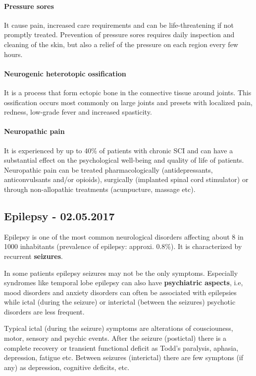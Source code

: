 \documentclass[12pt,article,oneside,a4paper]{memoir}
\begin{document}
\paragraph{Pressure sores}
It cause pain, increased care requirements and can be life-threatening if not
promptly treated. Prevention of pressure sores requires daily inspection and
cleaning of the skin, but also a relief of the pressure on each region every
few hours.

\paragraph{Neurogenic heterotopic ossification}
It is a process that form ectopic bone in the connective tissue around joints.
This ossification occurs most commonly on large joints and presets with
localized pain, redness, low-grade fever and increased spasticity.

\paragraph{Neuropathic pain}
It is experienced by up to 40\% of patients with chronic SCI and can have a
substantial effect on the psychological well-being and quality of life of
patients. Neuropathic pain can be treated pharmacologically (antidepressants,
anticonvulsants and/or opioids), surgically (implanted spinal cord stimulator)
or through non-allopathic treatments (acunpucture, massage etc).

\newpage
\subsection{Epilepsy - 02.05.2017}
Epilepsy is one of the most common neurological disorders affecting about 8 in
1000 inhabitants (prevalence of epilepsy: approxi. 0.8\%). It is characterized
by recurrent \textbf{seizures}.

In some patients epilepsy seizures may not be the only symptoms. Especially
syndromes like temporal lobe epilepsy can also have \textbf{psychiatric
aspects}, i.e, mood disorders and anxiety disorders can often be associated
with epilepsies while ictal (during the seizure) or interictal (between the
seizures) psychotic disorders are less frequent.

Typical ictal (during the seizure) symptoms are alterations of cousciouness,
motor, sensory and psychic events. After the seizure (postictal) there is a
complete recovery or transient functional deficit as Todd's paralysis, aphasia,
depression, fatigue etc. Between seizures (interictal) there are few symptons
(if any) as depression, cognitive deficits, etc.
\end{document}
